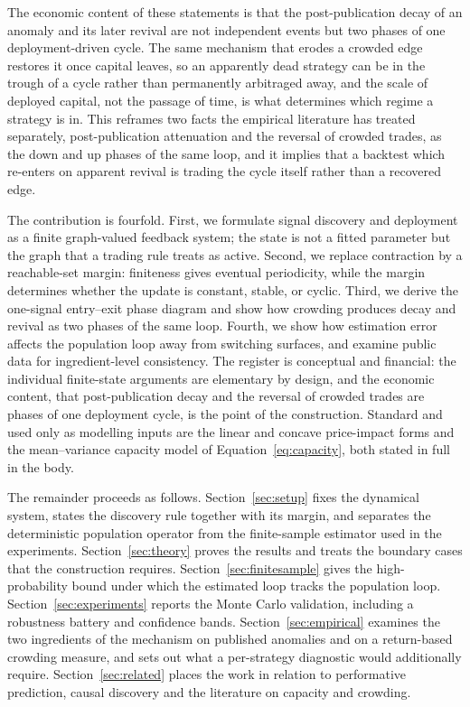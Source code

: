 \documentclass[11pt]{article}
\theoremstyle{plain}
\theoremstyle{definition}
\begin{document}
The economic content of these statements is that the post-publication decay of an anomaly and its later revival are not independent events but two phases of one deployment-driven cycle. The same mechanism that erodes a crowded edge restores it once capital leaves, so an apparently dead strategy can be in the trough of a cycle rather than permanently arbitraged away, and the scale of deployed capital, not the passage of time, is what determines which regime a strategy is in. This reframes two facts the empirical literature has treated separately, post-publication attenuation and the reversal of crowded trades, as the down and up phases of the same loop, and it implies that a backtest which re-enters on apparent revival is trading the cycle itself rather than a recovered edge.

The contribution is fourfold. First, we formulate signal discovery and deployment as a finite graph-valued feedback system; the state is not a fitted parameter but the graph that a trading rule treats as active. Second, we replace contraction by a reachable-set margin: finiteness gives eventual periodicity, while the margin determines whether the update is constant, stable, or cyclic. Third, we derive the one-signal entry--exit phase diagram and show how crowding produces decay and revival as two phases of the same loop. Fourth, we show how estimation error affects the population loop away from switching surfaces, and examine public data for ingredient-level consistency. The register is conceptual and financial: the individual finite-state arguments are elementary by design, and the economic content, that post-publication decay and the reversal of crowded trades are phases of one deployment cycle, is the point of the construction. Standard and used only as modelling inputs are the linear and concave price-impact forms and the mean--variance capacity model of Equation~\eqref{eq:capacity}, both stated in full in the body.

The remainder proceeds as follows. Section~\ref{sec:setup} fixes the dynamical system, states the discovery rule together with its margin, and separates the deterministic population operator from the finite-sample estimator used in the experiments. Section~\ref{sec:theory} proves the results and treats the boundary cases that the construction requires. Section~\ref{sec:finitesample} gives the high-probability bound under which the estimated loop tracks the population loop. Section~\ref{sec:experiments} reports the Monte Carlo validation, including a robustness battery and confidence bands. Section~\ref{sec:empirical} examines the two ingredients of the mechanism on published anomalies and on a return-based crowding measure, and sets out what a per-strategy diagnostic would additionally require. Section~\ref{sec:related} places the work in relation to performative prediction, causal discovery and the literature on capacity and crowding.
\end{document}
